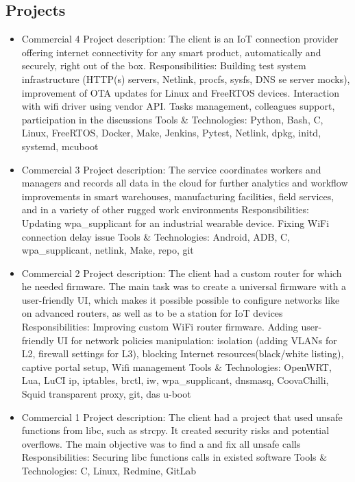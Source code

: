 \subsection{Projects}

\begin{itemize}
    \item Commercial 4\break
    Project description:\break
    The client is an IoT connection provider offering internet connectivity for any
    smart product, automatically and securely, right out of the box.\break
    Responsibilities:\break
    Building test system infrastructure (HTTP(s) servers, Netlink, procfs, sysfs, DNS
    se server mocks), improvement of OTA updates for Linux and FreeRTOS devices.
    Interaction with wifi driver using vendor API. Tasks management, colleagues
    support, participation in the discussions\break
    Tools \& Technologies:\break
    Python, Bash, C, Linux, FreeRTOS, Docker, Make, Jenkins, Pytest, Netlink, dpkg,
    initd, systemd, mcuboot
    \item Commercial 3\break
    Project description:\break
    The service coordinates workers and managers and records all data in the
    cloud for further analytics and workflow improvements in smart warehouses,
    manufacturing facilities, field services, and in a variety of other rugged work
    environments\break
    Responsibilities:\break
    Updating wpa\_supplicant for an industrial wearable device. Fixing WiFi
    connection delay issue
    Tools \& Technologies:\break
    Android, ADB, C, wpa\_supplicant, netlink, Make, repo, git
    \item Commercial 2\break
    Project description:\break
    The client had a custom router for which he needed firmware. The main task
    was to create a universal firmware with a user-friendly UI, which makes it
    possible possible to configure networks like on advanced routers, as well as to be a
    station for IoT devices\break
    Responsibilities:\break
    Improving custom WiFi router firmware. Adding user-friendly UI for network
    policies manipulation: isolation (adding VLANs for L2, firewall settings for L3),
    blocking Internet resources(black/white listing), captive portal setup,
    Wifi management\break
    Tools \& Technologies:\break
    OpenWRT, Lua, LuCI ip, iptables, brctl, iw, wpa\_supplicant, dnsmasq, CoovaChilli,
    Squid transparent proxy, git, das u-boot
    \item Commercial 1\break
    Project description:\break
    The client had a project that used unsafe functions from libc, such as strcpy. It
    created security risks and potential overflows. The main objective was to find
    a and fix all unsafe calls\break
    Responsibilities:\break
    Securing libc functions calls in existed software\break
    Tools \& Technologies:\break
    C, Linux, Redmine, GitLab
\end{itemize}

\newpage
